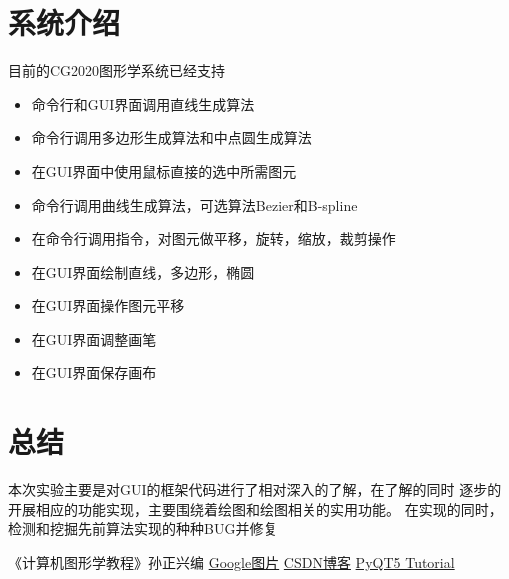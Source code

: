 \documentclass[a4paper,UTF8]{article}
\theoremstyle{definition}
\begin{document}
\section{系统介绍}
目前的CG2020图形学系统已经支持
\begin{itemize}
    \item 命令行和GUI界面调用直线生成算法
    \item 命令行调用多边形生成算法和中点圆生成算法
    \item 在GUI界面中使用鼠标直接的选中所需图元
    \item 命令行调用曲线生成算法，可选算法Bezier和B-spline
    \item 在命令行调用指令，对图元做平移，旋转，缩放，裁剪操作
    \item 在GUI界面绘制直线，多边形，椭圆
    \item 在GUI界面操作图元平移
    \item 在GUI界面调整画笔
    \item 在GUI界面保存画布
\end{itemize}

\section{总结}
本次实验主要是对GUI的框架代码进行了相对深入的了解，在了解的同时
逐步的开展相应的功能实现，主要围绕着绘图和绘图相关的实用功能。
在实现的同时，检测和挖掘先前算法实现的种种BUG并修复


\begin{thebibliography}{99}  
    《计算机图形学教程》孙正兴编 
     \href{https://www.google.com/imghp?hl=zh-CN&ogbl}{Google图片}
     \href{https://blog.csdn.net/shenziheng1/article/details/54411098}{CSDN博客}
     \href{https://build-system.fman.io/pyqt5-tutorial}{PyQT5 Tutorial}
\end{thebibliography}
\end{document}
